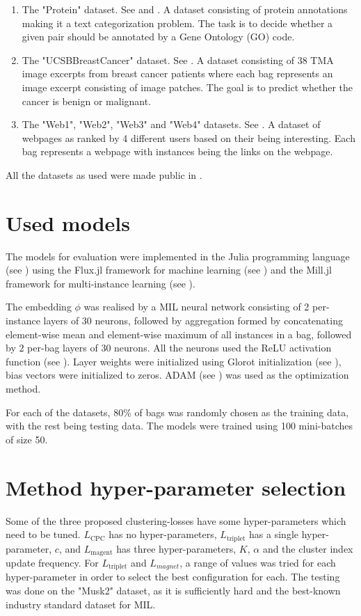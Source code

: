 \begin{enumerate}
  \item The "Protein" dataset. See \cite{ray_learning_2005} and \cite{ray_supervised_2005}. A dataset consisting of protein annotations making it a text categorization problem. The task is to decide whether a given pair should be annotated by a Gene Ontology (GO) code.
  \item The "UCSBBreastCancer" dataset. See \cite{kandemir_empowering_2014}. A dataset consisting of 38 TMA image excerpts from breast cancer patients where each bag represents an image excerpt consisting of image patches. The goal is to predict whether the cancer is benign or malignant.
  \item The "Web1", "Web2", "Web3" and "Web4" datasets. See \cite{zhou_multi-instance_2005}. A dataset of webpages as ranked by 4 different users based on their being interesting. Each bag represents a webpage with instances being the links on the webpage.
\end{enumerate}

All the datasets as used were made public in \cite{dedic_mildatasetsjl_2019}.

\section{Used models}

The models for evaluation were implemented in the Julia programming language (see \cite{bezanson_julia:_2017}) using the Flux.jl framework for machine learning (see \cite{innes_flux:_2018}) and the Mill.jl framework for multi-instance learning (see \cite{pevny_milljl_2019}).

The embedding \( \phi \) was realised by a MIL neural network consisting of 2 per-instance layers of 30 neurons, followed by aggregation formed by concatenating element-wise mean and element-wise maximum of all instances in a bag, followed by 2 per-bag layers of 30 neurons. All the neurons used the ReLU activation function (see \cite{hahnloser_digital_2000}). Layer weights were initialized using Glorot initialization (see \cite{glorot_understanding_2010}), bias vectors were initialized to zeros. ADAM (see \cite{kingma_adam:_2014}) was used as the optimization method.

For each of the datasets, 80\% of bags was randomly chosen as the training data, with the rest being testing data. The models were trained using 100 mini-batches of size 50.

\section{Method hyper-parameter selection}

Some of the three proposed clustering-losses have some hyper-parameters which need to be tuned. \( L_\mathrm{CPC} \) has no hyper-parameters, \( L_\mathrm{triplet} \) has a single hyper-parameter, \( c \), and \( L_\mathrm{magent} \) has three hyper-parameters, \( K \), \( α \) and the cluster index update frequency. For \( L_\mathrm{triplet} \) and \( L_{magnet} \), a range of values was tried for each hyper-parameter in order to select the best configuration for each. The testing was done on the "Musk2" dataset, as it is sufficiently hard and the best-known industry standard dataset for MIL.
